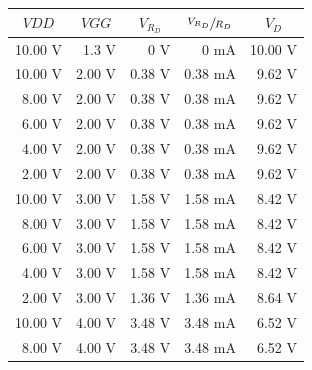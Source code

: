 \documentclass{article}
\begin{document}
\begin{figure}[H]
\begin{minipage}{.6\textwidth}
\begin{circuitikz}[scale=0.4]
\end{circuitikz}
\label{fig:figure2}
\end{minipage}
\begin{minipage}{.6\textwidth}
\begin{tabular}{ | r | r | r | r | r | }
    \hline
    \multicolumn{1}{|c}{\bfseries $VDD$}
    & \multicolumn{1}{|c}{\bfseries $VGG$}
    & \multicolumn{1}{|c}{\bfseries $V_{R_D}$}
    & \multicolumn{1}{|c}{\bfseries $\sfrac{V_{R_D}}{R_D}$}
    & \multicolumn{1}{|c|}{\bfseries $V_D$} \\ \hline
    10.00 \si{\volt} & 1.3 \si{\volt} & 0 \si{\volt} & 0 \si{\milli\ampere} & 10.00 \si{\volt} \\ \hline
    10.00 \si{\volt} & 2.00 \si{\volt} & 0.38 \si{\volt} & 0.38 \si{\milli\ampere} & 9.62 \si{\volt} \\ \hline
    8.00 \si{\volt} & 2.00 \si{\volt} & 0.38 \si{\volt} & 0.38 \si{\milli\ampere} & 9.62 \si{\volt} \\ \hline
    6.00 \si{\volt} & 2.00 \si{\volt} & 0.38 \si{\volt} & 0.38 \si{\milli\ampere} & 9.62 \si{\volt} \\ \hline
    4.00 \si{\volt} & 2.00 \si{\volt} & 0.38 \si{\volt} & 0.38 \si{\milli\ampere} & 9.62 \si{\volt} \\ \hline
    2.00 \si{\volt} & 2.00 \si{\volt} & 0.38 \si{\volt} & 0.38 \si{\milli\ampere} & 9.62 \si{\volt} \\ \hline
    10.00 \si{\volt} & 3.00 \si{\volt} & 1.58 \si{\volt} & 1.58 \si{\milli\ampere} & 8.42 \si{\volt} \\ \hline
    8.00 \si{\volt} & 3.00 \si{\volt} & 1.58 \si{\volt} & 1.58 \si{\milli\ampere} & 8.42 \si{\volt} \\ \hline
    6.00 \si{\volt} & 3.00 \si{\volt} & 1.58 \si{\volt} & 1.58 \si{\milli\ampere} & 8.42 \si{\volt} \\ \hline
    4.00 \si{\volt} & 3.00 \si{\volt} & 1.58 \si{\volt} & 1.58 \si{\milli\ampere} & 8.42 \si{\volt} \\ \hline
    2.00 \si{\volt} & 3.00 \si{\volt} & 1.36 \si{\volt} & 1.36 \si{\milli\ampere} & 8.64 \si{\volt} \\ \hline
    10.00 \si{\volt} & 4.00 \si{\volt} & 3.48 \si{\volt} & 3.48 \si{\milli\ampere} & 6.52 \si{\volt} \\ \hline
    8.00 \si{\volt} & 4.00 \si{\volt} & 3.48 \si{\volt} & 3.48 \si{\milli\ampere} & 6.52 \si{\volt} \\ \hline

\end{tabular}
\end{minipage}
\end{figure}
\end{document}

